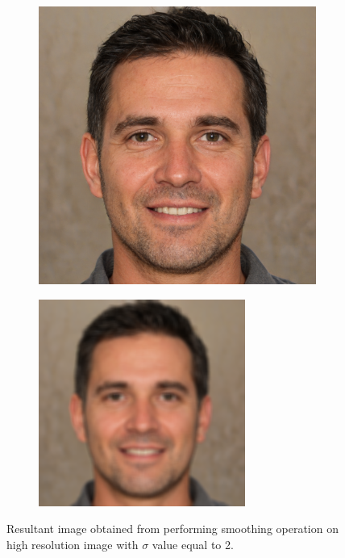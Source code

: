 \documentclass{70_styles/svproc}
\begin{document}
\begin{figure}
     \centering
     \begin{subfigure}[b]{0.2\textwidth}
         \centering
         \includegraphics[width=\textwidth]{70_figures/seed1830.png}
     \end{subfigure}
     \begin{subfigure}[b]{0.2\textwidth}
         \centering
         \includegraphics[width=\textwidth]{70_figures/smoothened-seed1830.png}
     \end{subfigure}
     \caption{Resultant image obtained from performing smoothing operation on high resolution image with $\sigma$ value equal to 2.}
\end{figure}
\end{document}
